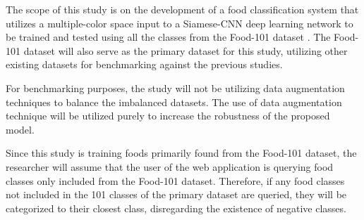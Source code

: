 The scope of this study is on the development of a food classification system that utilizes a multiple-color space input to a Siamese-CNN deep learning network to be trained and tested using all the classes from the Food-101 dataset \cite{bossard-2014}. The Food-101 dataset will also serve as the primary dataset for this study, utilizing other existing datasets for benchmarking against the previous studies.

For benchmarking purposes, the study will not be utilizing data augmentation techniques to balance the imbalanced datasets. The use of data augmentation technique will be utilized purely to increase the robustness of the proposed model.  

Since this study is training foods primarily found from the Food-101 dataset, the researcher will assume that the user of the web application is querying food classes only included from the Food-101 dataset. Therefore, if any food classes not included in the 101 classes of the primary dataset are queried, they will be categorized to their closest class, disregarding the existence of negative classes.